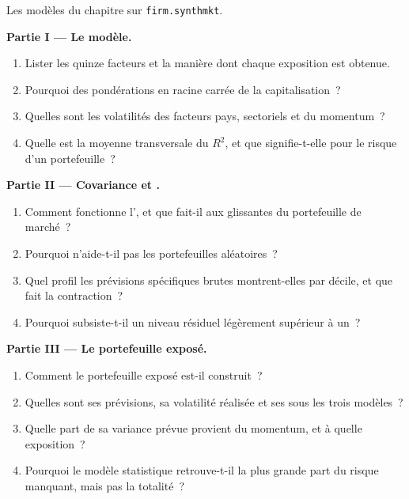 \begin{problem}\label{pb:rs:risk-models:1}
Les modèles du chapitre sur \texttt{firm.synthmkt}.

\medskip\noindent\textbf{Partie I --- Le modèle.}
\begin{enumerate}
\item Lister les quinze facteurs et la manière dont chaque exposition est obtenue.
\item Pourquoi des pondérations en racine carrée de la capitalisation~?
\item Quelles sont les volatilités des facteurs pays, sectoriels et du momentum~?
\item Quelle est la moyenne transversale du $R^2$, et que signifie-t-elle pour le risque d'un portefeuille~?
\end{enumerate}

\medskip\noindent\textbf{Partie II --- Covariance et .}
\begin{enumerate}[resume]
\item Comment fonctionne l', et que fait-il aux  glissantes du portefeuille de marché~?
\item Pourquoi n'aide-t-il pas les portefeuilles aléatoires~?
\item Quel profil les prévisions spécifiques brutes montrent-elles par décile, et que fait la contraction~?
\item Pourquoi subsiste-t-il un niveau résiduel légèrement supérieur à un~?
\end{enumerate}

\medskip\noindent\textbf{Partie III --- Le portefeuille exposé.}
\begin{enumerate}[resume]
\item Comment le portefeuille exposé est-il construit~?
\item Quelles sont ses prévisions, sa volatilité réalisée et ses  sous les trois modèles~?
\item Quelle part de sa variance prévue provient du momentum, et à quelle exposition~?
\item Pourquoi le modèle statistique retrouve-t-il la plus grande part du risque manquant, mais pas la totalité~?
\end{enumerate}


\end{problem}
